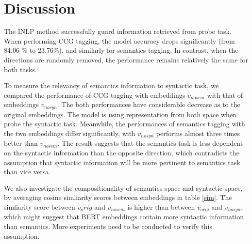 \documentclass[11pt,a4paper]{article}
\begin{document}



\section{Discussion}
\label{sec:discussion}
The INLP method successfully guard information retrieved from probe task. When performing CCG tagging, the model accuracy drops significantly (from 84.06 \% to 23.76\%), and similarly for semantics tagging. In contrast, when the directions are randomly removed, the performance remains relatively the same for both tasks.

To measure the relevancy of semantics information to syntactic task, we compared the performance of CCG tagging with embeddings $v_{nosem}$ with that of embeddings $v_{nosyn}$. The both performances have considerable decrease as to the original embeddings. The model is using representation from both space when probe the syntactic task. Meanwhile, the performances of semantics tagging with the two embeddings differ significantly, with $v_{nosyn}$ performs almost three times better than $v_{nosem}$. The result suggests that the semantics task is less dependent on the syntactic information than the opposite direction, which contradicts the assumption that syntactic information will be more pertinent to semantics task than vice versa. 

We also investigate the compositionality of semantics space and syntactic space, by averaging cosine simliarity scores between embeddings in table \ref{sim}. The simliarity score between $v_orig$ and $v_{nosem}$ is higher than between $v_{orig}$ and $v_{nosyn}$, which might suggest that BERT embeddings contain more syntactic information than semantics. More experiments need to be conducted to verify this assumption.
\end{document}
